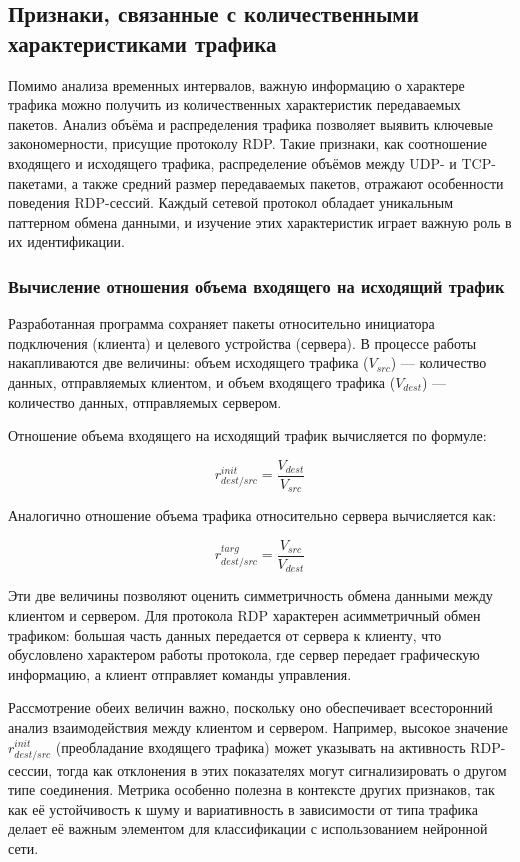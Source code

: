 \documentclass[bachelor, och, coursework]{SCWorks}
\begin{document}
\subsection{Признаки, связанные с количественными характеристиками трафика}


Помимо анализа временных интервалов, важную информацию о характере трафика можно получить из количественных характеристик передаваемых пакетов.
Анализ объёма и распределения трафика позволяет выявить ключевые закономерности, присущие протоколу RDP. Такие признаки, как соотношение 
входящего и исходящего трафика, распределение объёмов между UDP- и TCP-пакетами, а также средний размер передаваемых пакетов, отражают 
особенности поведения RDP-сессий. Каждый сетевой протокол обладает уникальным паттерном обмена данными, и изучение этих характеристик 
играет важную роль в их идентификации.

\subsubsection{Вычисление отношения объема входящего на исходящий трафик}

Разработанная программа сохраняет пакеты относительно инициатора подключения (клиента) и целевого устройства (сервера). В процессе работы накапливаются 
две величины: объем исходящего трафика ($V_{src}$) — количество данных, отправляемых клиентом, и объем входящего трафика ($V_{dest}$) — количество данных, 
отправляемых сервером.

Отношение объема входящего на исходящий трафик вычисляется по формуле:

\begin{equation}
  r_{dest/src}^{init} = \frac{V_{dest}}{V_{src}}
\end{equation}

Аналогично отношение объема трафика относительно сервера вычисляется как:

\begin{equation}
  r_{dest/src}^{targ} = \frac{V_{src}}{V_{dest}}
\end{equation}

Эти две величины позволяют оценить симметричность обмена данными между клиентом и сервером. Для протокола RDP характерен асимметричный обмен 
трафиком: большая часть данных передается от сервера к клиенту, что обусловлено характером работы протокола, где сервер передает графическую 
информацию, а клиент отправляет команды управления.

Рассмотрение обеих величин важно, поскольку оно обеспечивает всесторонний анализ взаимодействия между клиентом и сервером. Например, высокое 
значение $r_{dest/src}^{init}$ (преобладание входящего трафика) может указывать на активность RDP-сессии, тогда как отклонения в этих показателях 
могут сигнализировать о другом типе соединения. Метрика особенно полезна в контексте других признаков, так как её устойчивость к шуму и вариативность 
в зависимости от типа трафика делает её важным элементом для классификации с использованием нейронной сети.
\end{document}
